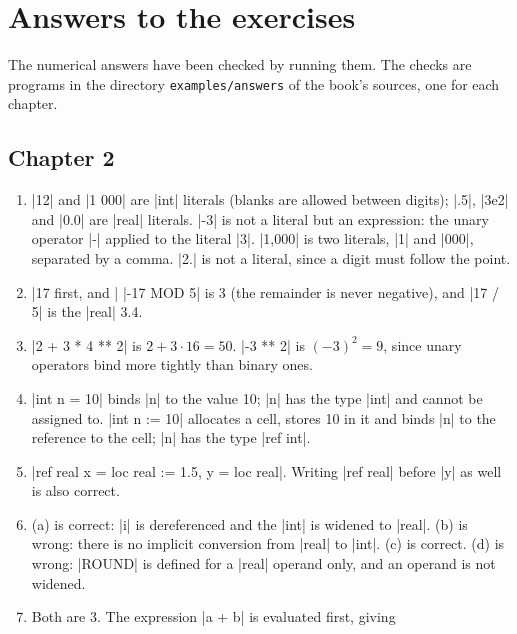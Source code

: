 \chapter*{Answers to the exercises}\label{ch-answers}

The numerical answers have been checked by running them. The checks are
programs in the directory \texttt{examples/answers} of the book's sources,
one for each chapter.

\section*{Chapter 2}\label{ans-ch2}

\begin{enumerate}
\item \code|12| and \code|1 000| are \code|int| literals (blanks are
  allowed between digits); \code|.5|,
  \code|3e2| and \code|0.0| are \code|real| literals. \code|-3| is not a
  literal but an expression: the unary operator \code|-| applied to the
  literal \code|3|. \code|1,000| is two literals, \code|1| and
  \code|000|, separated by a comma. \code|2.| is not a literal, since a
  digit must follow the point.
\item \code|17 %
  first, and \code|%
  \code|-17 MOD 5| is 3 (the remainder is never negative), and
  \code|17 / 5| is the \code|real| 3.4.
\item \code|2 + 3 * 4 ** 2| is $2 + 3 \cdot 16 = 50$. \code|-3 ** 2| is
  $(-3)^2 = 9$, since unary operators bind more tightly than binary ones.
\item \code|int n = 10| binds \code|n| to the value 10; \code|n| has the
  type \code|int| and cannot be assigned to. \code|int n := 10| allocates
  a cell, stores 10 in it and binds \code|n| to the reference to the cell;
  \code|n| has the type \code|ref int|.
\item \code|ref real x = loc real := 1.5, y = loc real|. Writing
  \code|ref real| before \code|y| as well is also correct.
\item (a) is correct: \code|i| is dereferenced and the \code|int| is
  widened to \code|real|. (b) is wrong: there is no implicit conversion
  from \code|real| to \code|int|. (c) is correct. (d) is wrong:
  \code|ROUND| is defined for a \code|real| operand only, and an operand
  is not widened.
\item Both are 3. The expression \code|a + b| is evaluated first, giving

\end{enumerate}

